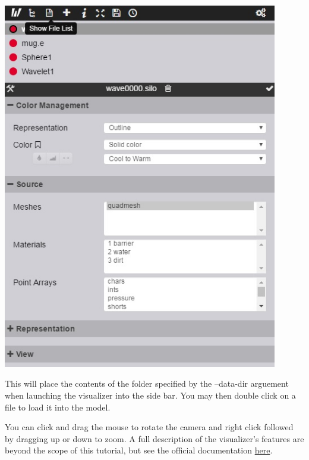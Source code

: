 \documentclass{article}
\begin{document}
\begin{center}
\includegraphics[width=12cm]{images/ParaViewVisualizer}
\end{center}

This will place the contents of the folder specified by the --data-dir arguement
when launching the visualizer into the side bar. You may then double click on a
file to load it into the model. 

You can click and drag the mouse to rotate the camera and right click followed
by dragging up or down to zoom. A full description of the visualizer's features
are beyond the scope of this tutorial, but see the official documentation
\href{http://www.paraview.org/ParaView3/Doc/Nightly/www/js-doc/index.html#!/guide/web_visualizer}{here}.
\end{document}
